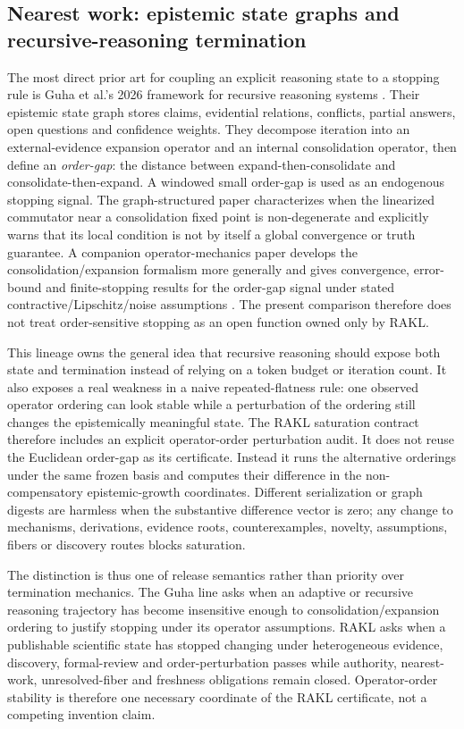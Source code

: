 \subsection{Nearest work: epistemic state graphs and recursive-reasoning termination}

The most direct prior art for coupling an explicit reasoning state to a stopping rule is Guha et al.'s 2026 framework for recursive reasoning systems \cite{guha2026termination}. Their epistemic state graph stores claims, evidential relations, conflicts, partial answers, open questions and confidence weights. They decompose iteration into an external-evidence expansion operator and an internal consolidation operator, then define an \emph{order-gap}: the distance between expand-then-consolidate and consolidate-then-expand. A windowed small order-gap is used as an endogenous stopping signal. The graph-structured paper characterizes when the linearized commutator near a consolidation fixed point is non-degenerate and explicitly warns that its local condition is not by itself a global convergence or truth guarantee. A companion operator-mechanics paper develops the consolidation/expansion formalism more generally and gives convergence, error-bound and finite-stopping results for the order-gap signal under stated contractive/Lipschitz/noise assumptions \cite{guha2026opmech}. The present comparison therefore does not treat order-sensitive stopping as an open function owned only by RAKL.

This lineage owns the general idea that recursive reasoning should expose both state and termination instead of relying on a token budget or iteration count. It also exposes a real weakness in a naive repeated-flatness rule: one observed operator ordering can look stable while a perturbation of the ordering still changes the epistemically meaningful state. The RAKL saturation contract therefore includes an explicit operator-order perturbation audit. It does not reuse the Euclidean order-gap as its certificate. Instead it runs the alternative orderings under the same frozen basis and computes their difference in the non-compensatory epistemic-growth coordinates. Different serialization or graph digests are harmless when the substantive difference vector is zero; any change to mechanisms, derivations, evidence roots, counterexamples, novelty, assumptions, fibers or discovery routes blocks saturation.

The distinction is thus one of release semantics rather than priority over termination mechanics. The Guha line asks when an adaptive or recursive reasoning trajectory has become insensitive enough to consolidation/expansion ordering to justify stopping under its operator assumptions. RAKL asks when a publishable scientific state has stopped changing under heterogeneous evidence, discovery, formal-review and order-perturbation passes while authority, nearest-work, unresolved-fiber and freshness obligations remain closed. Operator-order stability is therefore one necessary coordinate of the RAKL certificate, not a competing invention claim.

